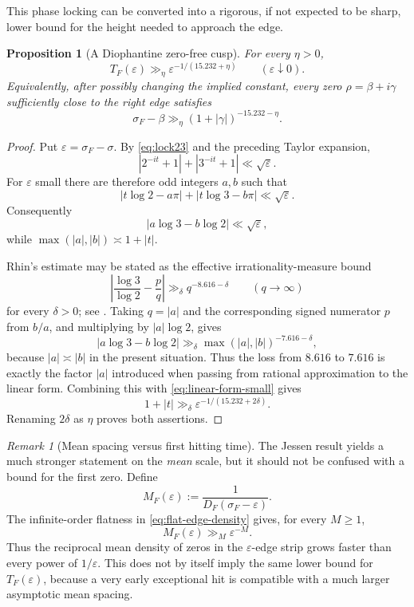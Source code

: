 \documentclass[11pt]{article}
\newtheorem{proposition}[theorem]{Proposition}
\theoremstyle{remark}
\newtheorem{remark}[theorem]{Remark}
\begin{document}
This phase locking can be converted into a rigorous, if not expected to be sharp, lower bound for the height needed to approach the edge.

\begin{proposition}[A Diophantine zero-free cusp]\label{prop:cusp}
For every $\eta>0$,
\begin{equation}\label{eq:T-lower}
T_F(\varepsilon)\gg_\eta
\varepsilon^{-1/(15.232+\eta)}
\qquad(\varepsilon\downarrow0).
\end{equation}
Equivalently, after possibly changing the implied constant, every zero $\rho=\beta+i\gamma$ sufficiently close to the right edge satisfies
\begin{equation}\label{eq:cusp}
\sigma_F-\beta\gg_\eta(1+|\gamma|)^{-15.232-\eta}.
\end{equation}
\end{proposition}

\begin{proof}
Put $\varepsilon=\sigma_F-\sigma$.  By \eqref{eq:lock23} and the preceding Taylor expansion,
\[
|2^{-it}+1|+|3^{-it}+1|\ll\sqrt\varepsilon.
\]
For $\varepsilon$ small there are therefore odd integers $a,b$ such that
\[
|t\log2-a\pi|+|t\log3-b\pi|\ll\sqrt\varepsilon.
\]
Consequently
\begin{equation}\label{eq:linear-form-small}
|a\log3-b\log2|\ll\sqrt\varepsilon,
\end{equation}
while $\max(|a|,|b|)\asymp1+|t|$.

Rhin's estimate may be stated as the effective irrationality-measure bound
\[
\left|\frac{\log3}{\log2}-\frac{p}{q}\right|
\gg_\delta q^{-8.616-\delta}
\qquad(q\to\infty)
\]
for every $\delta>0$; see \cite[Eq.~(8)]{Rhin1987}.  Taking $q=|a|$ and the corresponding signed numerator $p$ from $b/a$, and multiplying by $|a|\log2$, gives
\[
|a\log3-b\log2|\gg_\delta
\max(|a|,|b|)^{-7.616-\delta},
\]
because $|a|\asymp|b|$ in the present situation.  Thus the loss from $8.616$ to $7.616$ is exactly the factor $|a|$ introduced when passing from rational approximation to the linear form.  Combining this with \eqref{eq:linear-form-small} gives
\[
1+|t|\gg_\delta\varepsilon^{-1/(15.232+2\delta)}.
\]
Renaming $2\delta$ as $\eta$ proves both assertions.
\end{proof}

\begin{remark}[Mean spacing versus first hitting time]\label{rem:mean-v-first}
The Jessen result yields a much stronger statement on the \emph{mean} scale, but it should not be confused with a bound for the first zero.  Define
\[
M_F(\varepsilon):=\frac1{D_F(\sigma_F-\varepsilon)}.
\]
The infinite-order flatness in \eqref{eq:flat-edge-density} gives, for every $M\ge1$,
\begin{equation}\label{eq:mean-superpoly}
M_F(\varepsilon)\gg_M\varepsilon^{-M}.
\end{equation}
Thus the reciprocal mean density of zeros in the $\varepsilon$-edge strip grows faster than every power of $1/\varepsilon$.  This does not by itself imply the same lower bound for $T_F(\varepsilon)$, because a very early exceptional hit is compatible with a much larger asymptotic mean spacing.
\end{remark}
\end{document}
